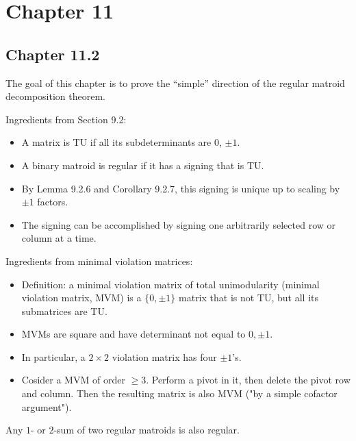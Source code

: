 \section{Chapter 11}

\subsection{Chapter 11.2}

The goal of this chapter is to prove the ``simple'' direction of the regular matroid decomposition theorem.

Ingredients from Section 9.2: %
\begin{itemize}
  \item A matrix is TU if all its subdeterminants are $0$, $\pm 1$.
  \item A binary matroid is regular if it has a signing that is TU.
  \item By Lemma 9.2.6 and Corollary 9.2.7, this signing is unique up to scaling by $\pm 1$ factors.
  \item The signing can be accomplished by signing one arbitrarily selected row or column at a time.
\end{itemize}

Ingredients from minimal violation matrices: %
\begin{itemize}
  \item Definition: a minimal violation matrix of total unimodularity (minimal violation matrix, MVM) is a $\{0, \pm 1\}$ matrix that is not TU, but all its submatrices are TU.
  \item MVMs are square and have determinant not equal to $0, \pm 1$.
  \item In particular, a $2 \times 2$ violation matrix has four $\pm 1$'s.
  \item Cosider a MVM of order $\ge 3$. Perform a pivot in it, then delete the pivot row and column. Then the resulting matrix is also MVM ("by a simple cofactor argument").
\end{itemize}

\begin{lemma}[11.2.1]
  \label{lem:11.2.1}
  Any $1$- or $2$-sum of two regular matroids is also regular.
\end{lemma}


